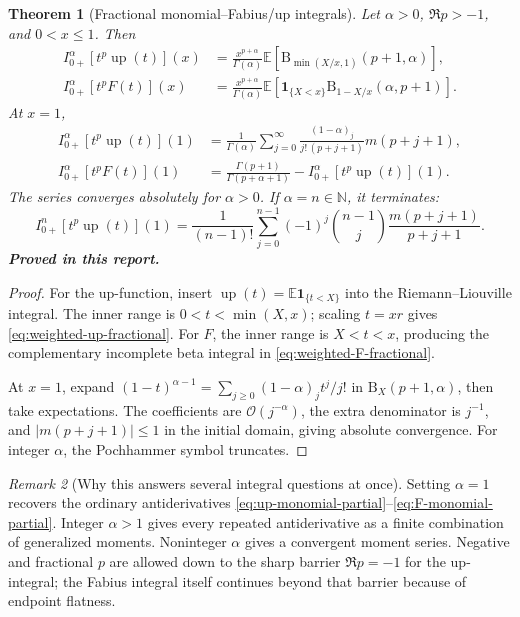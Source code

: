 \documentclass[11pt,oneside]{article}
\numberwithin{equation}{section}
\newtheorem{theorem}{Theorem}[section]
\theoremstyle{definition}
\theoremstyle{remark}
\newtheorem{remark}[theorem]{Remark}
\newcommand{\N}{\mathbb N}
\newcommand{\Up}{\operatorname{up}}
\newcommand{\E}{\mathbb E}
\newcommand{\bigO}{\mathcal O}
\newcommand{\statusproved}{\textcolor{proofgreen}{\textbf{Proved in this report.}}}
\begin{document}
\begin{theorem}[Fractional monomial--Fabius/up integrals]
\label{thm:weighted-fractional-master}
Let \(\alpha>0\), \(\Re p>-1\), and \(0<x\le1\).  Then
\begin{align}
 I_{0+}^{\alpha}[t^p\Up(t)](x)
 &=\frac{x^{p+\alpha}}{\Gamma(\alpha)}
 \E\!\left[
 \mathrm B_{\min(X/x,1)}(p+1,\alpha)
 \right],
 \label{eq:weighted-up-fractional}\\
 I_{0+}^{\alpha}[t^pF(t)](x)
 &=\frac{x^{p+\alpha}}{\Gamma(\alpha)}
 \E\!\left[
 \mathbf1_{\{X<x\}}
 \mathrm B_{1-X/x}(\alpha,p+1)
 \right].
 \label{eq:weighted-F-fractional}
\end{align}
At \(x=1\),
\begin{align}
 I_{0+}^{\alpha}[t^p\Up(t)](1)
 &=\frac1{\Gamma(\alpha)}
 \sum_{j=0}^{\infty}
 \frac{(1-\alpha)_j}{j!\,(p+j+1)}m(p+j+1),
 \label{eq:weighted-up-series}\\
 I_{0+}^{\alpha}[t^pF(t)](1)
 &=\frac{\Gamma(p+1)}{\Gamma(p+\alpha+1)}
 -I_{0+}^{\alpha}[t^p\Up(t)](1).
 \label{eq:weighted-F-series}
\end{align}
The series converges absolutely for \(\alpha>0\).  If \(\alpha=n\in\N\), it
terminates:
\begin{equation}
 I_{0+}^{n}[t^p\Up(t)](1)
 =\frac1{(n-1)!}
 \sum_{j=0}^{n-1}(-1)^j\binom{n-1}{j}
 \frac{m(p+j+1)}{p+j+1}.
 \label{eq:weighted-integer-terminating}
\end{equation}
\statusproved
\end{theorem}

\begin{proof}
For the up-function, insert
\(\Up(t)=\E\mathbf1_{\{t<X\}}\) into the Riemann--Liouville integral.  The
inner range is \(0<t<\min(X,x)\); scaling \(t=xr\) gives
\eqref{eq:weighted-up-fractional}.  For \(F\), the inner range is
\(X<t<x\), producing the complementary incomplete beta integral in
\eqref{eq:weighted-F-fractional}.

At \(x=1\), expand
\((1-t)^{\alpha-1}=\sum_{j\ge0}(1-\alpha)_jt^j/j!\) in
\(\mathrm B_X(p+1,\alpha)\), then take expectations.  The coefficients are
\(\bigO(j^{-\alpha})\), the extra denominator is \(j^{-1}\), and
\(|m(p+j+1)|\le1\) in the initial domain, giving absolute convergence.
For integer \(\alpha\), the Pochhammer symbol truncates.
\end{proof}

\begin{remark}[Why this answers several integral questions at once]
Setting \(\alpha=1\) recovers the ordinary antiderivatives
\eqref{eq:up-monomial-partial}--\eqref{eq:F-monomial-partial}.  Integer
\(\alpha>1\) gives every repeated antiderivative as a finite combination of
generalized moments.  Noninteger \(\alpha\) gives a convergent moment series.
Negative and fractional \(p\) are allowed down to the sharp barrier
\(\Re p=-1\) for the up-integral; the Fabius integral itself continues beyond
that barrier because of endpoint flatness.
\end{remark}
\end{document}

